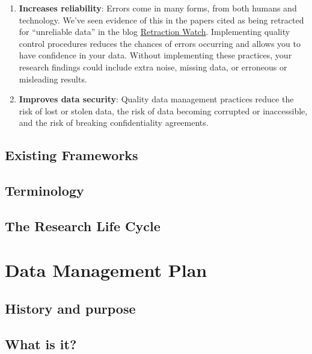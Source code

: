 \documentclass[
]{book}
\begin{document}
\begin{enumerate}
\item
  \textbf{Increases reliability}: Errors come in many forms, from both humans and technology. We've seen evidence of this in the papers cited as being retracted for ``unreliable data'' in the blog \href{https://retractionwatch.com/}{Retraction Watch}. Implementing quality control procedures reduces the chances of errors occurring and allows you to have confidence in your data. Without implementing these practices, your research findings could include extra noise, missing data, or erroneous or misleading results.
\item
  \textbf{Improves data security}: Quality data management practices reduce the risk of lost or stolen data, the risk of data becoming corrupted or inaccessible, and the risk of breaking confidentiality agreements.
\end{enumerate}

\hypertarget{existing-frameworks}{%
\section{Existing Frameworks}\label{existing-frameworks}}

\hypertarget{terminology}{%
\section{Terminology}\label{terminology}}

\hypertarget{the-research-life-cycle}{%
\section{The Research Life Cycle}\label{the-research-life-cycle}}

\hypertarget{dmp}{%
\chapter{Data Management Plan}\label{dmp}}

\hypertarget{history-and-purpose}{%
\section{History and purpose}\label{history-and-purpose}}

\hypertarget{what-is-it}{%
\section{What is it?}\label{what-is-it}}
\end{document}
